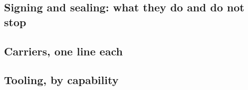 \subsection{Signing and sealing: what they do and do not stop}
\unwritten

\subsection{Carriers, one line each}
\unwritten

\subsection{Tooling, by capability}
\unwritten
